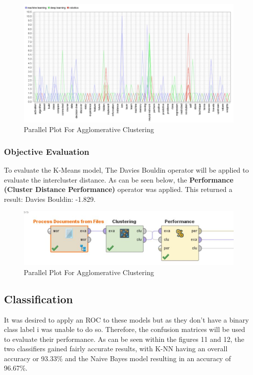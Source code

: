 \begin{figure}[ht]
	\begin{center}
		\advance\leftskip-3cm
		\advance\rightskip-3cm
		\includegraphics[keepaspectratio=true,scale=0.7]{__resources/cluster-eval.JPG}
		\caption{Parallel Plot For Agglomerative Clustering}
		\label{stop}
	\end{center}
\end{figure}
\newpage

\subsubsection*{Objective Evaluation}
To evaluate the K-Means model, The Davies Bouldin operator will be applied to evaluate the intercluster distance. As can be seen below, the \textbf{Performance (Cluster Distance Performance)} operator was applied. This returned a result: Davies Bouldin: -1.829.

\begin{figure}[ht]
	\begin{center}
		\advance\leftskip-3cm
		\advance\rightskip-3cm
		\includegraphics[keepaspectratio=true,scale=0.9]{__resources/db.JPG}
		\caption{Parallel Plot For Agglomerative Clustering}
		\label{stop}
	\end{center}
\end{figure}

\newpage
\subsection*{Classification}
It was desired to apply an ROC to these models but as they don't have a binary class label i was unable to do so. Therefore, the confusion matrices will be used to evaluate their performance.
As can be seen within the figures 11 and 12, the two classifiers gained fairly accurate results, with K-NN having an overall accuracy or 93.33\% and the Naive Bayes model resulting in an accuracy of 96.67\%.

